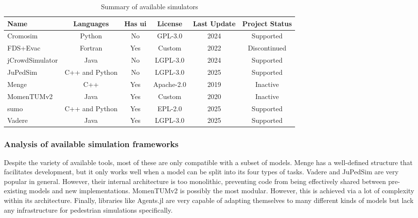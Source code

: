\documentclass[twoside, 11pt]{article}
\begin{document}
\begin{center}
  \begin{table}[h]
    \begin{tabularx}{\textwidth}{ | X | c | c | c | c | c | } 
      \hline
      Name & Languages & Has \gls{ui} & License & Last Update & Project Status \\ 
      \hline
      Cromosim & Python & No & GPL-3.0 & 2024 & Supported\\
      \hline
      FDS+Evac & Fortran & Yes & Custom & 2022 & Discontinued \\
      \hline
      jCrowdSimulator & Java & No & LGPL-3.0 & 2024 & Supported \\
      \hline
      JuPedSim & C++ and Python & No & LGPL-3.0 & 2025 & Supported \\
      \hline
      Menge & C++ & Yes & Apache-2.0 & 2019 & Inactive \\
      \hline 
      MomenTUMv2 & Java & Yes & Custom & 2020 & Inactive \\
      \hline 
      \gls{sumo} & C++ and Python & Yes & EPL-2.0 & 2025 & Supported \\
      \hline 
      Vadere & Java & Yes & LGPL-3.0 & 2025 & Supported \\
      \hline 

    \end{tabularx}
    \caption{Summary of available simulators}
    \label{table:available-simulators-summary}
  \end{table}
\end{center}

\subsubsection{Analysis of available simulation frameworks}

Despite the variety of available tools, most of these are only compatible with a subset of models. Menge has a well-defined structure that facilitates development, but it only works well when a model can be split into its four types of tasks. Vadere and JuPedSim are very popular in general. However, their internal architecture is too monolithic, preventing code from being effectively shared between pre-existing models and new implementations. MomenTUMv2 is possibly the most modular. However, this is achieved via a lot of complexity within its architecture. Finally, libraries like Agents.jl are very capable of adapting themselves to many different kinds of models but lack any infrastructure for pedestrian  simulations specifically.
\end{document}

